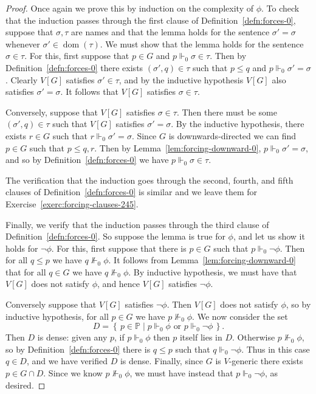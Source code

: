 \documentclass[11pt,oneside]{amsbook}
\newcommand{\set}[1]{\left\{\,#1\,\right\}}
\newcommand{\PP}{\mathbb P}
\newcommand{\forces}{\Vdash}
\DeclareMathOperator{\dom}{dom}
\theoremstyle{definition}
\theoremstyle{plain}
\theoremstyle{definition}
\theoremstyle{remark}
\numberwithin{equation}{section}
\numberwithin{figure}{section}
\begin{document}
\begin{proof}
  Once again we prove this by induction on the complexity of $\phi$. To check that the induction passes through the first clause of Definition~\ref{defn:forces-0}, suppose that $\sigma,\tau$ are names and that the lemma holds for the sentence $\sigma'=\sigma$ whenever $\sigma'\in\dom(\tau)$. We must show that the lemma holds for the sentence $\sigma\in\tau$. For this, first suppose that $p\in G$ and $p\forces_0\sigma\in\tau$. Then by Definition~\ref{defn:forces-0} there exists $(\sigma',q)\in\tau$ such that $p\leq q$ and $p\forces_0\sigma'=\sigma$. Clearly $V[G]$ satisfies $\sigma'\in\tau$, and by the inductive hypothesis $V[G]$ also satisfies $\sigma'=\sigma$. It follows that $V[G]$ satisfies $\sigma\in\tau$.

  Conversely, suppose that $V[G]$ satisfies $\sigma\in\tau$. Then there must be some $(\sigma',q)\in\tau$ such that $V[G]$ satisfies $\sigma'=\sigma$. By the inductive hypothesis, there exists $r\in G$ such that $r\forces_0\sigma'=\sigma$. Since $G$ is downwards-directed we can find $p\in G$ such that $p\leq q,r$. Then by Lemma~\ref{lem:forcing-downward-0}, $p\forces_0\sigma'=\sigma$, and so by Definition~\ref{defn:forces-0} we have $p\forces_0\sigma\in\tau$.

  The verification that the induction goes through the second, fourth, and fifth clauses of Definition~\ref{defn:forces-0} is similar and we leave them for Exercise~\ref{exerc:forcing-clauses-245}.

  Finally, we verify that the induction passes through the third clause of Definition~\ref{defn:forces-0}. So suppose the lemma is true for $\phi$, and let us show it holds for $\neg\phi$. For this, first suppose that there is $p\in G$ such that $p\forces_0\neg\phi$. Then for all $q\leq p$ we have $q\not\forces_0\phi$. It follows from Lemma~\ref{lem:forcing-downward-0} that for all $q\in G$ we have $q\not\forces_0\phi$. By inductive hypothesis, we must have that $V[G]$ does not satisfy $\phi$, and hence $V[G]$ satisfies $\neg\phi$.

  Conversely suppose that $V[G]$ satisfies $\neg\phi$. Then $V[G]$ does not satisfy $\phi$, so by inductive hypothesis, for all $p\in G$ we have $p\not\forces_0\phi$. We now consider the set
\[D=\set{p\in\PP\mid p\forces_0\phi\text{ or }p\forces_0\neg\phi}\text{.}
\]
Then $D$ is dense: given any $p$, if $p\forces_0\phi$ then $p$ itself lies in $D$. Otherwise $p\not\forces_0\phi$, so by Definition~\ref{defn:forces-0} there is $q\leq p$ such that $q\forces_0\neg\phi$. Thus in this case $q\in D$, and we have verified $D$ is dense. Finally, since $G$ is $V$-generic there exists $p\in G\cap D$. Since we know $p\not\forces_0\phi$, we must have instead that $p\forces_0\neg\phi$, as desired.
\end{proof}
\end{document}
